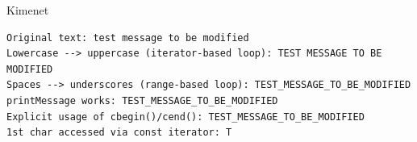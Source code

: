 \begin{frame}
    \begin{exampleblock}{}
        
        
    \end{exampleblock}
\end{frame}

\begin{frame}
    \begin{exampleblock}{}
        \scriptsize
        
    \end{exampleblock}
\end{frame}

\begin{frame}[fragile]
    \begin{exampleblock}{}
        \scriptsize
        
    \end{exampleblock}
        \begin{block}{Kimenet}
        \vspace{-.3cm}
        \scriptsize
        \begin{verbatim}
Original text: test message to be modified
Lowercase --> uppercase (iterator-based loop): TEST MESSAGE TO BE MODIFIED
Spaces --> underscores (range-based loop): TEST_MESSAGE_TO_BE_MODIFIED
printMessage works: TEST_MESSAGE_TO_BE_MODIFIED
Explicit usage of cbegin()/cend(): TEST_MESSAGE_TO_BE_MODIFIED
1st char accessed via const iterator: T
\end{verbatim}
    \vspace{-.3cm}
    \end{block}
\end{frame}

\begin{frame}
    \begin{exampleblock}{}
        \footnotesize
        
    \end{exampleblock}
\end{frame}

